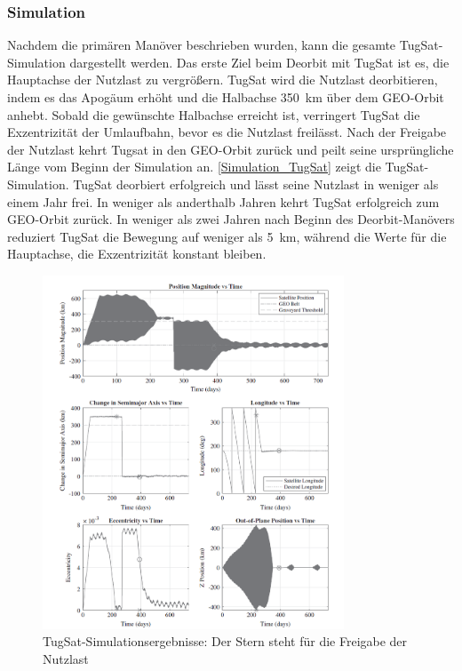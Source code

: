 \documentclass{article}
\begin{document}
\subsubsection{Simulation}
Nachdem die primären Manöver beschrieben wurden, kann die gesamte TugSat-Simulation dargestellt werden. 
Das erste Ziel beim Deorbit mit TugSat ist es, die Hauptachse der Nutzlast zu vergrößern. TugSat wird die Nutzlast deorbitieren, indem es das Apogäum erhöht und die Halbachse \SI{350}{\kilo\meter} über dem GEO-Orbit anhebt. Sobald die gewünschte Halbachse erreicht ist, verringert TugSat die Exzentrizität der Umlaufbahn, bevor es die Nutzlast freilässt. Nach der Freigabe der Nutzlast kehrt Tugsat in den GEO-Orbit zurück und peilt seine ursprüngliche Länge vom Beginn der Simulation an. \autoref{Simulation_TugSat} zeigt die TugSat-Simulation. TugSat deorbiert erfolgreich und lässt seine Nutzlast in weniger als einem Jahr frei. In weniger als anderthalb Jahren kehrt TugSat erfolgreich zum GEO-Orbit zurück. In weniger als zwei Jahren nach Beginn des Deorbit-Manövers reduziert TugSat die Bewegung auf weniger als \SI{5}{\kilo\meter}, während die Werte für die Hauptachse, die Exzentrizität konstant bleiben.

\begin{figure}[htbp]
	\centering
	\includegraphics[width=0.8\textwidth]{bilder/Simulation_TugSat.png}
	\caption{TugSat-Simulationsergebnisse: Der Stern steht für die Freigabe der Nutzlast}
	\label{Simulation_TugSat}
\end{figure}
\end{document}
